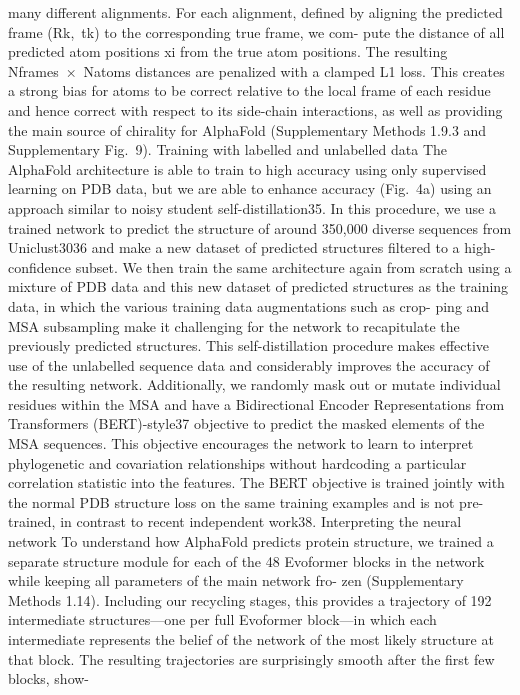 many different alignments. For each alignment, defined by aligning
the predicted frame (Rk, tk) to the corresponding true frame, we com-
pute the distance of all predicted atom positions xi from the true atom
positions. The resulting Nframes × Natoms distances are penalized with a
clamped L1 loss. This creates a strong bias for atoms to be correct relative
to the local frame of each residue and hence correct with respect to its
side-chain interactions, as well as providing the main source of chirality
for AlphaFold (Supplementary Methods 1.9.3 and Supplementary Fig. 9).
Training with labelled and unlabelled data
The AlphaFold architecture is able to train to high accuracy using only
supervised learning on PDB data, but we are able to enhance accuracy
(Fig. 4a) using an approach similar to noisy student self-distillation35.
In this procedure, we use a trained network to predict the structure of
around 350,000 diverse sequences from Uniclust3036 and make a new
dataset of predicted structures filtered to a high-confidence subset. We
then train the same architecture again from scratch using a mixture of
PDB data and this new dataset of predicted structures as the training
data, in which the various training data augmentations such as crop-
ping and MSA subsampling make it challenging for the network to
recapitulate the previously predicted structures. This self-distillation
procedure makes effective use of the unlabelled sequence data and
considerably improves the accuracy of the resulting network.
Additionally, we randomly mask out or mutate individual residues
within the MSA and have a Bidirectional Encoder Representations from
Transformers (BERT)-style37 objective to predict the masked elements of
the MSA sequences. This objective encourages the network to learn to
interpret phylogenetic and covariation relationships without hardcoding
a particular correlation statistic into the features. The BERT objective is
trained jointly with the normal PDB structure loss on the same training
examples and is not pre-trained, in contrast to recent independent work38.
Interpreting the neural network
To understand how AlphaFold predicts protein structure, we trained
a separate structure module for each of the 48 Evoformer blocks in
the network while keeping all parameters of the main network fro-
zen (Supplementary Methods 1.14). Including our recycling stages,
this provides a trajectory of 192 intermediate structures—one per full
Evoformer block—in which each intermediate represents the belief of
the network of the most likely structure at that block. The resulting
trajectories are surprisingly smooth after the first few blocks, show-
